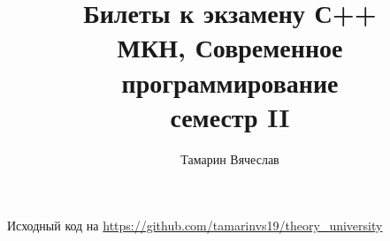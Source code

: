\documentclass[11pt,dvipsnames]{report}
\title{Билеты к экзамену С++ \\ 
    МКН, Современное программирование \\
     семестр II
 }
\author{Тамарин Вячеслав}
\date{\displaydate{date}}
\begin{document}
\maketitle
\tableofcontents
\hspace{1em}
\center Исходный код на \url{https://github.com/tamarinvs19/theory_university}

\newpage  
\newpage  
\newpage  
\newpage  
\newpage  
\newpage  
\newpage  
\newpage  
\newpage  
\newpage  
\newpage  
\newpage  
\newpage  
\end{document}
